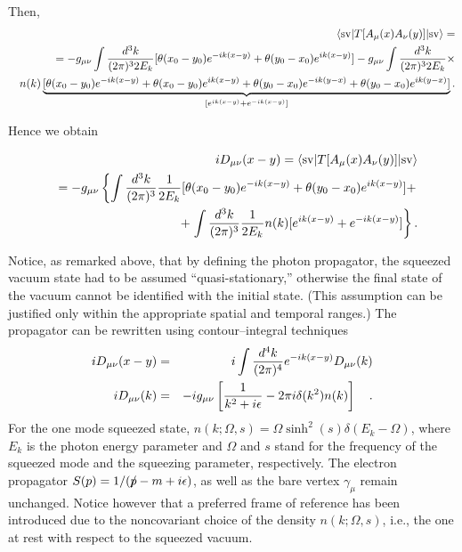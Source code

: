  Then,
\begin{eqnarray*}
&& \langle {\rm sv}\vert T[A_\mu (x)A_\nu (y)]\vert {\rm sv}\rangle= \\
 &&= -g_{\mu \nu}\int {d^3k\over (2\pi )^3 2E_k}
 [\theta (x_0-y_0)e^{-ik(x-y)}+
 \theta (y_0-x_0)e^{ik(x-y)}] - g_{\mu \nu}\int {d^3k\over (2\pi )^3 2E_k}\times \\
 && n(k) \underbrace {[\theta (x_0-y_0)e^{-ik(x-y)} +
 \theta (x_0-y_0)e^{ik(x-y)} + \theta (y_0-x_0)e^{-ik(y-x)} +
 \theta (y_0-x_0)e^{ik(y-x)}]}_{[e^{ik(x-y)} + e^{-ik(x-y)}]}          .
\end{eqnarray*}

Hence we obtain

\begin{eqnarray}
 &&iD_{\mu \nu}(x-y)=\langle {\rm sv}\vert T[A_\mu (x)A_\nu (y)]\vert
 {\rm sv}\rangle \nonumber \\
 &&=-g_{\mu \nu}\left\{ \int {d^3k\over (2\pi )^3}{1\over 2E_k}[\theta
 (x_0-y_0)e^{-ik (x-y)}+\theta (y_0-x_0)e^{ik (x-y)}]+
 \right.
 \nonumber \\
 &&\qquad \qquad +  \left.\int
 {d^3k\over (2\pi )^3}{1\over 2E_k}
 n(k)[e^{ik (x-y)}+e^{-ik (x-y)}]\right\}
.
 \end{eqnarray}


Notice, as remarked above, that by defining the photon propagator,
the squeezed vacuum state had to be assumed ``quasi-stationary,''
otherwise the final state of the vacuum cannot be identified with the
initial state. (This assumption can be justified only within the appropriate
spatial and temporal ranges.)
The propagator can be rewritten using contour--integral techniques
\begin{eqnarray}
iD_{\mu \nu}(x-y)&=&i\int {d^4k\over (2\pi )^4}e^{-ik(x-y)}D_{\mu \nu }
 (k)\nonumber \\
iD_{\mu \nu }(k)&=&-ig_{\mu \nu }\left[{1\over k^2+i\epsilon }-2\pi i
\delta (k^2)n(k)\right] \quad .                     \label{prop}
\end{eqnarray}
For the one mode squeezed state, $n(k;\Omega ,s)=\Omega \sinh^2(s)
\delta (
E_k -\Omega )$, where $E_k$ is the photon energy parameter and $\Omega$
 and $s$ stand for the frequency of
the squeezed mode and the squeezing parameter, respectively.
The  electron propagator $S(p)=1/(\rlap{/}p -m+i\epsilon )$, as well
as the bare vertex $\gamma_\mu$ remain unchanged.
 Notice however that a preferred frame of
 reference has been introduced due to the noncovariant choice of the
 density $n(k;\Omega ,s)$, i.e., the one at rest with respect to
 the squeezed vacuum.

